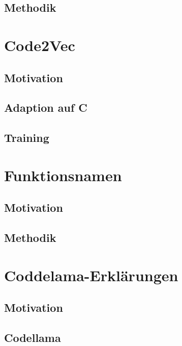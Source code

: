 \documentclass[12pt,letterpaper,ngerman]{article}
\begin{document}
\subsection{Methodik} 
\section{Code2Vec}
\subsection{Motivation} 
\subsection{Adaption auf C} 
\subsection{Training}
\section{Funktionsnamen}
\subsection{Motivation}
\subsection{Methodik}
\section{Coddelama-Erklärungen}
\subsection{Motivation}
\subsection{Codellama} 
\end{document}
